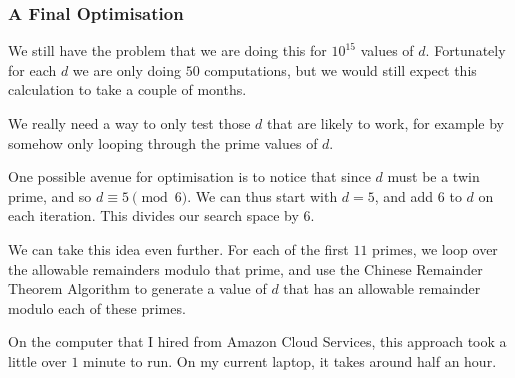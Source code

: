 \documentclass[handout]{beamer}
\begin{document}
\begin{frame}

	\frametitle{A Final Optimisation}

	We still have the problem that we are doing this for $10^{15}$ values of $d$. Fortunately for each $d$ we are only doing $50$ computations, but we would still expect this calculation to take a couple of months. \pause

	We really need a way to only test those $d$ that are likely to work, for example by somehow only looping through the prime values of $d$. \pause

	One possible avenue for optimisation is to notice that since $d$ must be a twin prime, and so $d \equiv 5 \pmod 6$. We can thus start with $d = 5$, and add $6$ to $d$ on each iteration. This divides our search space by $6$. \pause

	We can take this idea even further. For each of the first $11$ primes, we loop over the allowable remainders modulo that prime, and use the Chinese Remainder Theorem Algorithm to generate a value of $d$ that has an allowable remainder modulo each of these primes. \pause

	On the computer that I hired from Amazon Cloud Services, this approach took a little over $1$ minute to run. On my current laptop, it takes around half an hour.

\end{frame}
\end{document}
